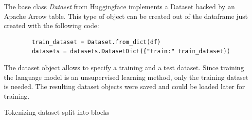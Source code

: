 The base class \textit{Dataset} from Huggingface implements a Dataset backed by an Apache Arrow table. This type of object can be created out of the dataframe just created with the following code:

\begin{verbatim}
		train_dataset = Dataset.from_dict(df)
		datasets = datasets.DatasetDict({"train:" train_dataset})
\end{verbatim}

The dataset object allows to specify a training and a test dataset. Since training the language model is an unsupervised learning method, only the training dataset is needed. The resulting dataset objects were saved and could be loaded later for training.

\alert{Tokenizing dataset
split into blocks}